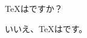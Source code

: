 \documentclass[dvipdfmx,class=jsarticle,margin=6pt]{standalone}
\begin{document}
\begin{minipage}{20zw}
\vspace*{1\baselineskip}
{\TeX}はですか？
\par\bigskip
いいえ、{\TeX}はです。
\vspace*{3\baselineskip}
\end{minipage}
\end{document}
